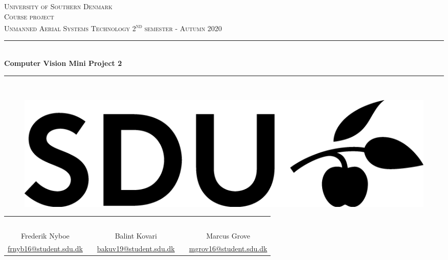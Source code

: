 \documentclass[../Head/Main.tex]{subfiles}
\begin{document}
\begin{titlepage}
\begin{center}
\textsc{\LARGE University of Southern Denmark}\\[1.25cm]

\textsc{Course project}\\[0.35cm]

\textsc{\large Unmanned Aerial Systems Technology 2\textsuperscript{nd} semester - Autumn 2020}\\[0.35cm]
\rule{\linewidth}{0.5mm}\\[0.35cm]
{ \LARGE \bfseries Computer Vision Mini Project 2\\[0.35cm]}
\rule{\linewidth}{0.5mm}\\[1cm]

\vspace{3cm}

    \begin{figure}[h!]
    \centering
    \includegraphics[scale=1]{../Figures/SDUlogo}
    \label{fig:SDUlogo}\\
    [2.5cm]
    \end{figure}

\begin{tabular}{c c c c c}
    \\
    \\
    \\
    \\
    \\
    \\    
    \cline{1-1}\cline{3-3}\cline{5-5}
    Frederik Nyboe & & Balint Kovari & & Marcus Grove \\
    \href{mailto:frnyb16@student.sdu.dk}{frnyb16@student.sdu.dk} & & \href{mailto:bakuv19@student.sdu.dk}{bakuv19@student.sdu.dk} & &
    \href{mailto:mgrov16@student.sdu.dk}{mgrov16@student.sdu.dk}
    \\
\end{tabular}	

\vfill


\end{center}
\end{titlepage}
\end{document}

